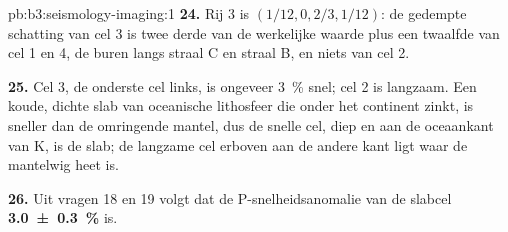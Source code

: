 \begin{solution}{pb:b3:seismology-imaging:1}
\textbf{24.} Rij 3 is $(1/12, 0, 2/3, 1/12)$: de gedempte schatting van cel 3 is
twee derde van de werkelijke waarde plus een twaalfde van cel 1 en 4, de buren
langs straal C en straal B, en niets van cel 2.

\textbf{25.} Cel 3, de onderste cel links, is ongeveer
\qty{3}{\percent} snel; cel 2 is langzaam. Een koude, dichte slab van oceanische
lithosfeer die onder het continent zinkt, is sneller dan de omringende mantel,
dus de snelle cel, diep en aan de oceaankant van K, is de slab; de langzame
cel erboven aan de andere kant ligt waar de mantelwig heet is.

\textbf{26.} Uit vragen 18 en 19 volgt dat de P-snelheidsanomalie van de slabcel
\textbf{\qty[text-series-to-math=true, uncertainty-mode=separate]{3.0 \pm 0.3}{\percent}} is.
\end{solution}
